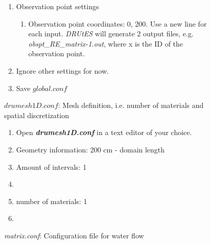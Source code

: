 \documentclass[
10pt, %
a4paper, %
oneside, %
headinclude,footinclude, %
BCOR5mm, %
]{scrartcl}
\begin{document}
\begin{figure}[!h]
\begin{enumerate}
\begin{enumerate}
\end{enumerate}
\item Observation point settings \begin{enumerate}
\item Observation point coordinates: 0, 200. Use a new line for each input. \textit{DRUtES} will generate 2 output files, e.g. \textit{obspt\_RE\_matrix-1.out}, where x is the ID of the observation point. 
\end{enumerate}
\item Ignore other settings for now. 
\item Save $global.conf$
\end{enumerate}


$drumesh1D.conf$: Mesh definition, i.e. number of materials and spatial discretization
\begin{enumerate}
\item Open \textbf{\emph{drumesh1D.conf}} in a text editor of your choice. 
\item Geometry information: 200 cm - domain length
\item Amount of intervals: 1
\item
{}
\item number of materials: 1
\item {}
\end{enumerate}

\emph{matrix.conf}: Configuration file for water flow 



\end{figure}
\end{document}
